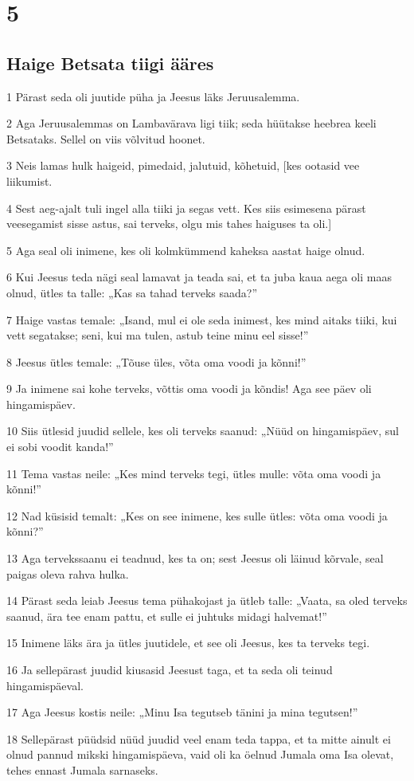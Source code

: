 \chapter{5}

\section*{Haige Betsata tiigi ääres}

\par 1 Pärast seda oli juutide püha ja Jeesus läks Jeruusalemma.
\par 2 Aga Jeruusalemmas on Lambavärava ligi tiik; seda hüütakse heebrea keeli Betsataks. Sellel on viis võlvitud hoonet.
\par 3 Neis lamas hulk haigeid, pimedaid, jalutuid, kõhetuid, [kes ootasid vee liikumist.
\par 4 Sest aeg-ajalt tuli ingel alla tiiki ja segas vett. Kes siis esimesena pärast veesegamist sisse astus, sai terveks, olgu mis tahes haiguses ta oli.]
\par 5 Aga seal oli inimene, kes oli kolmkümmend kaheksa aastat haige olnud.
\par 6 Kui Jeesus teda nägi seal lamavat ja teada sai, et ta juba kaua aega oli maas olnud, ütles ta talle: „Kas sa tahad terveks saada?”
\par 7 Haige vastas temale: „Isand, mul ei ole seda inimest, kes mind aitaks tiiki, kui vett segatakse; seni, kui ma tulen, astub teine minu eel sisse!”
\par 8 Jeesus ütles temale: „Tõuse üles, võta oma voodi ja kõnni!”
\par 9 Ja inimene sai kohe terveks, võttis oma voodi ja kõndis! Aga see päev oli hingamispäev.
\par 10 Siis ütlesid juudid sellele, kes oli terveks saanud: „Nüüd on hingamispäev, sul ei sobi voodit kanda!”
\par 11 Tema vastas neile: „Kes mind terveks tegi, ütles mulle: võta oma voodi ja kõnni!”
\par 12 Nad küsisid temalt: „Kes on see inimene, kes sulle ütles: võta oma voodi ja kõnni?”
\par 13 Aga tervekssaanu ei teadnud, kes ta on; sest Jeesus oli läinud kõrvale, seal paigas oleva rahva hulka.
\par 14 Pärast seda leiab Jeesus tema pühakojast ja ütleb talle: „Vaata, sa oled terveks saanud, ära tee enam pattu, et sulle ei juhtuks midagi halvemat!”
\par 15 Inimene läks ära ja ütles juutidele, et see oli Jeesus, kes ta terveks tegi.
\par 16 Ja sellepärast juudid kiusasid Jeesust taga, et ta seda oli teinud hingamispäeval.
\par 17 Aga Jeesus kostis neile: „Minu Isa tegutseb tänini ja mina tegutsen!”
\par 18 Sellepärast püüdsid nüüd juudid veel enam teda tappa, et ta mitte ainult ei olnud pannud mikski hingamispäeva, vaid oli ka öelnud Jumala oma Isa olevat, tehes ennast Jumala sarnaseks.

